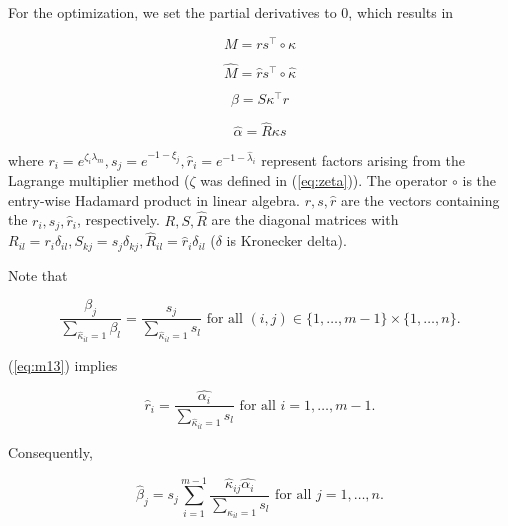 \documentclass[phd,12pt,oneside]{ubcthesis}
\begin{document}
{\noindent}For the optimization, we set the partial derivatives to
$0$, which results in

\begin{equation}
  \label{eq:m10}
  M=rs^{\top}\circ\kappa
\end{equation}

\begin{equation}
  \label{eq:m11}
  \hat{M}=\hat{r}s^{\top}\circ\hat{\kappa}
\end{equation}

\begin{equation}
  \label{eq:m12}
  \beta=S\kappa^{\top}r
\end{equation}

\begin{equation}
  \label{eq:m13}
  \hat{\alpha}=\hat{R}\kappa{}s
\end{equation}

{\noindent}where
$r_{i}=e^{\zeta_{i}\lambda_{m}},s_{j}=e^{-1-\xi_{j}},\hat{r}_{i}=e^{-1-\hat{\lambda}_{i}}$
represent factors arising from the Lagrange multiplier method ($\zeta$
was defined in (\ref{eq:zeta})). The
operator $\circ$ is the entry-wise Hadamard product in linear algebra.
$r,s,\hat{r}$ are the vectors containing the
$r_{i},s_{j},\hat{r}_{i}$, respectively. $R,S,\hat{R}$ are the
diagonal matrices with
$R_{il}=r_{i}\delta_{il},S_{kj}=s_{j}\delta_{kj},\hat{R}_{il}=\hat{r}_{i}\delta_{il}$
($\delta$ is Kronecker delta).

Note that 

\begin{equation}
  \label{eq:m14}
  \frac{\beta_{j}}{\sum_{\hat{\kappa}_{il}=1}\beta_{l}}=\frac{s_{j}}{\sum_{\hat{\kappa}_{il}=1}s_{l}}\mbox{ for all }(i,j)\in\{1,\ldots,m-1\}\times\{1,\ldots,n\}.
\end{equation}

{\noindent}(\ref{eq:m13}) implies

\begin{equation}
  \label{eq:m15}
  \hat{r}_{i}=\frac{\hat{\alpha_{i}}}{\sum_{\hat{\kappa}_{il}=1}s_{l}}\mbox{ for all }i=1,\ldots,m-1.
\end{equation}

{\noindent}Consequently,

\begin{equation}
  \label{eq:m16}
  \hat{\beta}_{j}=s_{j}\sum_{i=1}^{m-1}\frac{\hat{\kappa}_{ij}\hat{\alpha_{i}}}{\sum_{\kappa_{il}=1}s_{l}}\mbox{ for all }j=1,\ldots,n.
\end{equation}
\end{document}
